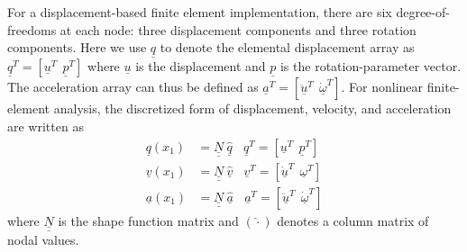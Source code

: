 \documentclass{aiaa-tc}
\newcommand{\tens}[1]{\underline{\underline{#1}}}
\renewcommand{\vec}[1]{\underline{#1}}
\begin{document}
For a displacement-based finite element implementation, there are six
degree-of-freedoms at each node: three displacement components and three
rotation components. Here we use $\vec{q}$ to denote the elemental
displacement array as $\underline{q}^T=\left[
\underline{u}^T~~\underline{p}^T\right]$ where $\vec{u}$ is the
displacement and $\vec{p}$ is the rotation-parameter vector. The
acceleration array can thus be defined as $\underline{a}^T=\left[
\ddot{\underline{u}}^T~~ \dot{\underline{\omega}}^T \right]$. For nonlinear
finite-element analysis, the discretized form of
displacement, velocity, and acceleration are written as
\begin{align}
	\label{DiscretizedDisp}
	\underline{q} (x_1) &= \underline{\underline{N}} ~\hat{\underline{q}}~~~~\underline{q}^T = \left[ \underline{u}^T~~\underline{p}^T \right] \\
	\label{DiscretizedVel}
	\underline{v}(x_1) &= \underline{\underline{N}}~\hat{\underline{v}}~~~~\underline{v}^T = \left[\underline{\dot{u}}^T~~\underline{\omega}^T \right] \\
	\label{DiscretizedAcc}
	\underline{a}(x_1) &= \underline{\underline{N}}~ \hat{\underline{a}}~~~~\underline{a}^T = \left[ \ddot{\underline{u}}^T~~\dot{\underline{\omega}}^T \right]	
\end{align}
where $\tens{N}$ is the shape function matrix and $(\hat{\cdot})$ denotes a
column matrix of nodal values.
\end{document}
